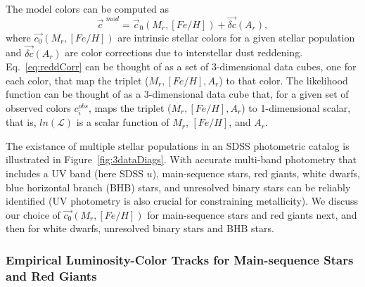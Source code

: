 The model colors can be computed as
\begin{equation}
  \label{eq:reddCorr} 
                       \vec{c}^{\,\,mod}  = \vec{c}_0(M_r, [Fe/H]) + \vec{\delta c}(A_r),
\end{equation}
where $\vec{c_0}(M_r, [Fe/H])$ are intrinsic stellar colors for a given stellar population and $\vec{\delta c}(A_r)$ are
color corrections due to interstellar dust reddening. Eq.~\ref{eq:reddCorr} can be thought of as a set of 
3-dimensional data cubes, one for each color, that map the triplet ($M_r, [Fe/H], A_r$) to that color. 
The likelihood function can be thought of as a  3-dimensional data cube that, for a given set of observed colors $c^{obs}_i$,
maps the triplet ($M_r, [Fe/H], A_r$) to 1-dimensional scalar, that is, $ln (\mathcal{L})$ is a scalar function of
$M_r$, $[Fe/H]$, and $A_r$.
        
The existance of multiple stellar populations in an SDSS photometric catalog is illustrated in Figure~\ref{fig:3dataDiags}.
With accurate multi-band photometry that includes a UV band (here SDSS $u$), main-sequence stars, red giants,
white dwarfs, blue horizontal branch (BHB) stars, and unresolved binary stars can be reliably identified (UV photometry
is also crucial for constraining metallicity). We discuss our choice of $\vec{c_0}(M_r, [Fe/H])$ for main-sequence stars
and red giants next, and then for white dwarfs, unresolved binary stars and BHB stars. 

\subsubsection{Empirical Luminosity-Color Tracks for Main-sequence Stars and Red Giants}

